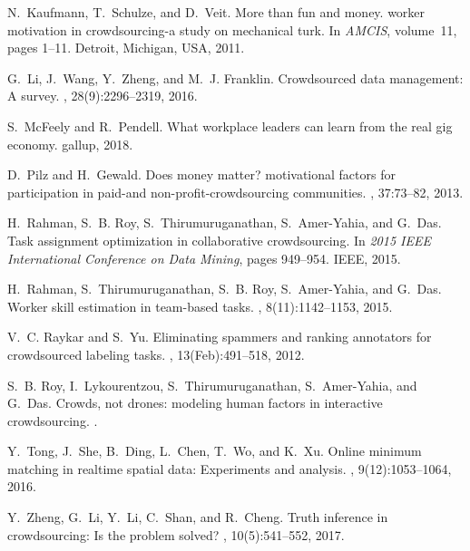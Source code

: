 \documentclass[11pt]{article}
\begin{document}
\begin{thebibliography}{10}
	N.~Kaufmann, T.~Schulze, and D.~Veit.
	\newblock More than fun and money. worker motivation in crowdsourcing-a study
	on mechanical turk.
	\newblock In {\em AMCIS}, volume~11, pages 1--11. Detroit, Michigan, USA, 2011.
	
	G.~Li, J.~Wang, Y.~Zheng, and M.~J. Franklin.
	\newblock Crowdsourced data management: A survey.
	,
	28(9):2296--2319, 2016.
	
	S.~McFeely and R.~Pendell.
	\newblock What workplace leaders can learn from the real gig economy. gallup,
	2018.
	
	D.~Pilz and H.~Gewald.
	\newblock Does money matter? motivational factors for participation in paid-and
	non-profit-crowdsourcing communities.
	, 37:73--82, 2013.
	
	H.~Rahman, S.~B. Roy, S.~Thirumuruganathan, S.~Amer-Yahia, and G.~Das.
	\newblock Task assignment optimization in collaborative crowdsourcing.
	\newblock In {\em 2015 IEEE International Conference on Data Mining}, pages
	949--954. IEEE, 2015.
	
	H.~Rahman, S.~Thirumuruganathan, S.~B. Roy, S.~Amer-Yahia, and G.~Das.
	\newblock Worker skill estimation in team-based tasks.
	, 8(11):1142--1153, 2015.
	
	V.~C. Raykar and S.~Yu.
	\newblock Eliminating spammers and ranking annotators for crowdsourced labeling
	tasks.
	, 13(Feb):491--518, 2012.
	
	S.~B. Roy, I.~Lykourentzou, S.~Thirumuruganathan, S.~Amer-Yahia, and G.~Das.
	\newblock Crowds, not drones: modeling human factors in interactive
	crowdsourcing.
	.
	
	Y.~Tong, J.~She, B.~Ding, L.~Chen, T.~Wo, and K.~Xu.
	\newblock Online minimum matching in realtime spatial data: Experiments and
	analysis.
	, 9(12):1053--1064, 2016.
	
	Y.~Zheng, G.~Li, Y.~Li, C.~Shan, and R.~Cheng.
	\newblock Truth inference in crowdsourcing: Is the problem solved?
	, 10(5):541--552, 2017.
	
\end{thebibliography}
\end{document}
